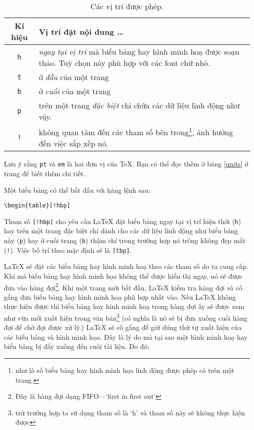 \begin{table}[!tbp]
\caption{Các vị trí được phép.}\label{tab:permiss}
\noindent
\begin{minipage}{\textwidth}
\medskip

\begin{center}
\begin{tabular}{@{}cp{10cm}@{}}
Kí hiệu & Vị trí đặt nội dung \ldots\\ \hline
\rule{0pt}{1.05em}\texttt{h} & \emph{ngay tại vị trí} mà biểu bảng hay hình minh hoạ được soạn thảo. Tuỳ chọn này phù hợp với các font chữ nhỏ.\\
[0.3ex] \texttt{t} & ở \emph{đầu} của một trang\\[0.3ex] \texttt{b} & ở \emph{cuối} của một trang\\
[0.3ex] \texttt{p} & trên một trang \emph{đặc biệt} chỉ chứa các dữ liệu linh động như vậy.\\
[0.3ex] \texttt{!} & không quan tâm đến các tham số bên trong\footnote{như là số biểu bảng hay hình minh họa linh động được phép có trên một trang.}, ảnh hưởng đến việc sắp xếp nó.
\end{tabular}
\end{center}

\noindent Lưu ý rằng \texttt{pt} và \texttt{em} là hai đơn vị của \TeX{}. Bạn có thể đọc thêm ở bảng \ref{units} ở trang \pageref{units} để biết thêm chi tiết.
\end{minipage}
\end{table}

Một biểu bảng có thể bắt đầu với hàng lệnh sau:
\begin{code}
\verb|\begin{table}[!hbp]|
\end{code}
%
\noindent Tham số  \verb|[!hbp]| cho yêu cầu \LaTeX{} đặt biểu bảng ngay tại vị trí hiện thời (\texttt{h}) hay
trên một trang đặc biệt chỉ dành cho các dữ liệu linh động như biểu bảng này (\texttt{p}) hay ở cuối trang (\texttt{b}) thậm chí trong trường hợp nó trông không đẹp mắt (\texttt{!}). Việc bố trí theo mặc định sẽ là \verb|[tbp]|.

\LaTeX{} sẽ đặt các biểu bảng hay hình minh hoạ theo các tham số do ta cung cấp. Khi mà biểu bảng hay hình minh họa
không thể được hiển thị ngay, nó sẽ được đưa vào hàng đợi\footnote{Đây là hàng đợi dạng FIFO---`first in first out'}.
Khi một trang mới bắt đầu, \LaTeX{} kiểm tra hàng đợi và cố gắng đưa biểu bảng hay hình minh hoạ phù hợp nhất vào. Nếu \LaTeX{} không thực hiện được thì biểu bảng hay hình minh hoạ trong hàng đợi ấy sẽ được xem như vừa mới xuất hiện trong văn bản\footnote{trừ trường hợp ta sử dụng tham số là `h' và tham số này sẽ không thực hiện được} (có nghĩa là nó sẽ bị đưa xuống cuối hàng đợi để chờ đợi được xử lý.) \LaTeX{} sẽ cố gắng để giữ đúng thứ tự xuất hiện của các biểu bảng và hình minh họa. Đây là lý do mà tại sao một hình minh hoạ hay biểu bảng bị đẩy xuống đến cuối tài liệu. Do đó:

